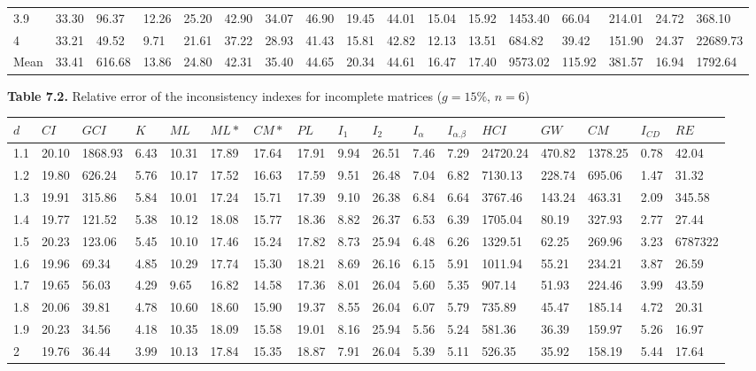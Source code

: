 \begin{adjustbox}{angle=90}
\begin{center}
{\begin{tabular}{|l|llllllllllllllll|}
3.9&33.30&96.37&12.26&25.20&42.90&34.07&46.90&19.45&44.01&15.04&15.92&1453.40&66.04&214.01&24.72&368.10  \\ 
4&33.21&49.52&9.71&21.61&37.22&28.93&41.43&15.81&42.82&12.13&13.51&684.82&39.42&151.90&24.37&22689.73  \\ \hline \hline
Mean&33.41&616.68&13.86&24.80&42.31&35.40&44.65&20.34&44.61&16.47&17.40&9573.02&115.92&381.57&16.94&1792.64  \\ \hline
\end{tabular}
}
\end{center}
\end{adjustbox}




\newpage
\textbf{Table 7.2.} Relative error of the inconsistency indexes for incomplete matrices ($g=15\%$, $n=6$)
\begin{adjustbox}{angle=90}
  \begin{center}
    \begin{tabular}{|l|llllllllllllllll|}
      \hline $d$ &
$CI$&$	\textit{GCI}$&$K$&$ML$&$ML*$&$CM*$&$PL$&$I_1$&$I_2$&$I_{\alpha}$&$I_{\alpha.\beta}$&$HCI$&$GW$&$CM$&$I_{CD}$&$RE$\\ \hline \hline
1.1&20.10&1868.93&6.43&10.31&17.89&17.64&17.91&9.94&26.51&7.46&7.29&24720.24&470.82&1378.25&0.78&42.04  \\ 
1.2&19.80&626.24&5.76&10.17&17.52&16.63&17.59&9.51&26.48&7.04&6.82&7130.13&228.74&695.06&1.47&31.32  \\ 
1.3&19.91&315.86&5.84&10.01&17.24&15.71&17.39&9.10&26.38&6.84&6.64&3767.46&143.24&463.31&2.09&345.58  \\ 
1.4&19.77&121.52&5.38&10.12&18.08&15.77&18.36&8.82&26.37&6.53&6.39&1705.04&80.19&327.93&2.77&27.44  \\ 
1.5&20.23&123.06&5.45&10.10&17.46&15.24&17.82&8.73&25.94&6.48&6.26&1329.51&62.25&269.96&3.23&6787322  \\ 
1.6&19.96&69.34&4.85&10.29&17.74&15.30&18.21&8.69&26.16&6.15&5.91&1011.94&55.21&234.21&3.87&26.59  \\ 
1.7&19.65&56.03&4.29&9.65&16.82&14.58&17.36&8.01&26.04&5.60&5.35&907.14&51.93&224.46&3.99&43.59  \\ 
1.8&20.06&39.81&4.78&10.60&18.60&15.90&19.37&8.55&26.04&6.07&5.79&735.89&45.47&185.14&4.72&20.31  \\ 
1.9&20.23&34.56&4.18&10.35&18.09&15.58&19.01&8.16&25.94&5.56&5.24&581.36&36.39&159.97&5.26&16.97  \\ 
2&19.76&36.44&3.99&10.13&17.84&15.35&18.87&7.91&26.04&5.39&5.11&526.35&35.92&158.19&5.44&17.64  \\ 

\end{tabular}
\end{center}
\end{adjustbox}
